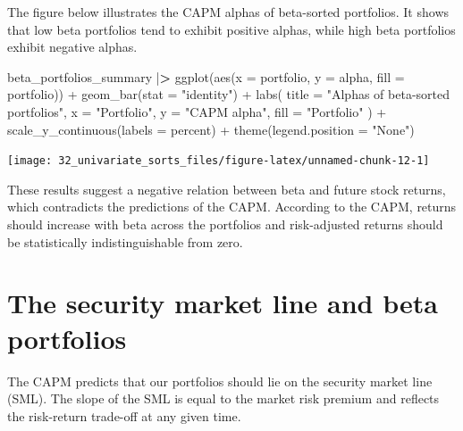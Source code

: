 \documentclass[
]{book}
\newenvironment{Shaded}{\begin{snugshade}}{\end{snugshade}}
\newcommand{\AttributeTok}[1]{\textcolor[rgb]{0.61,0.61,0.61}{#1}}
\newcommand{\ErrorTok}[1]{\textcolor[rgb]{0.14,0.14,0.14}{\textbf{#1}}}
\newcommand{\FunctionTok}[1]{\textcolor[rgb]{0,0,0}{#1}}
\newcommand{\NormalTok}[1]{#1}
\newcommand{\SpecialCharTok}[1]{\textcolor[rgb]{0,0,0}{#1}}
\newcommand{\StringTok}[1]{\textcolor[rgb]{0.5,0.5,0.5}{#1}}
\begin{document}
The figure below illustrates the CAPM alphas of beta-sorted portfolios. It shows that low beta portfolios tend to exhibit positive alphas, while high beta portfolios exhibit negative alphas.

\begin{Shaded}
\begin{Highlighting}[]
\NormalTok{beta\_portfolios\_summary }\SpecialCharTok{|}\ErrorTok{\textgreater{}}
  \FunctionTok{ggplot}\NormalTok{(}\FunctionTok{aes}\NormalTok{(}\AttributeTok{x =}\NormalTok{ portfolio, }\AttributeTok{y =}\NormalTok{ alpha, }\AttributeTok{fill =}\NormalTok{ portfolio)) }\SpecialCharTok{+}
  \FunctionTok{geom\_bar}\NormalTok{(}\AttributeTok{stat =} \StringTok{"identity"}\NormalTok{) }\SpecialCharTok{+}
  \FunctionTok{labs}\NormalTok{(}
    \AttributeTok{title =} \StringTok{"Alphas of beta{-}sorted portfolios"}\NormalTok{,}
    \AttributeTok{x =} \StringTok{"Portfolio"}\NormalTok{,}
    \AttributeTok{y =} \StringTok{"CAPM alpha"}\NormalTok{,}
    \AttributeTok{fill =} \StringTok{"Portfolio"}
\NormalTok{  ) }\SpecialCharTok{+}
  \FunctionTok{scale\_y\_continuous}\NormalTok{(}\AttributeTok{labels =}\NormalTok{ percent) }\SpecialCharTok{+}
  \FunctionTok{theme}\NormalTok{(}\AttributeTok{legend.position =} \StringTok{"None"}\NormalTok{)}
\end{Highlighting}
\end{Shaded}

\begin{center}\texttt{[image: 32\_univariate\_sorts\_files/figure-latex/unnamed-chunk-12-1]} \end{center}

These results suggest a negative relation between beta and future stock returns, which contradicts the predictions of the CAPM. According to the CAPM, returns should increase with beta across the portfolios and risk-adjusted returns should be statistically indistinguishable from zero.

\hypertarget{the-security-market-line-and-beta-portfolios}{%
\section{The security market line and beta portfolios}\label{the-security-market-line-and-beta-portfolios}}

The CAPM predicts that our portfolios should lie on the security market line (SML). The slope of the SML is equal to the market risk premium and reflects the risk-return trade-off at any given time.
\end{document}
